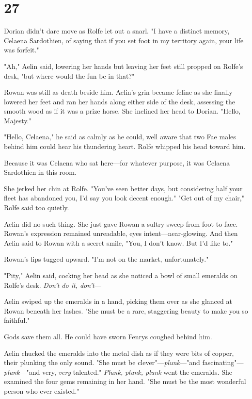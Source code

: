 
\chapter{27}

Dorian didn't dare move as Rolfe let out a snarl. "I have a distinct memory, Celaena Sardothien, of saying that if you set foot in my territory again, your life was forfeit."

"Ah," Aelin said, lowering her hands but leaving her feet still propped on Rolfe's desk, "but where would the fun be in that?"

Rowan was still as death beside him. Aelin's grin became feline as she finally lowered her feet and ran her hands along either side of the desk, assessing the smooth wood as if it was a prize horse. She inclined her head to Dorian. "Hello, Majesty."

"Hello, Celaena," he said as calmly as he could, well aware that two Fae males behind him could hear his thundering heart. Rolfe whipped his head toward him.

Because it was Celaena who sat here---for whatever purpose, it was Celaena Sardothien in this room.

She jerked her chin at Rolfe. "You've seen better days, but considering half your fleet has abandoned you, I'd say you look decent enough." "Get out of my chair," Rolfe said too quietly.

Aelin did no such thing. She just gave Rowan a sultry sweep from foot to face. Rowan's expression remained unreadable, eyes intent---near-glowing. And then Aelin said to Rowan with a secret smile, "You, I don't know. But I'd like to."

Rowan's lips tugged upward. "I'm not on the market, unfortunately."

"Pity," Aelin said, cocking her head as she noticed a bowl of small emeralds on Rolfe's desk. \emph{Don't do it, don't}---

Aelin swiped up the emeralds in a hand, picking them over as she glanced at Rowan beneath her lashes. "She must be a rare, staggering beauty to make you so faithful."

Gods save them all. He could have sworn Fenrys coughed behind him.

Aelin chucked the emeralds into the metal dish as if they were bits of copper, their plunking the only sound. "She must be clever"---\emph{plunk}---"and fascinating"---\emph{plunk}---"and very, \emph{very} talented." \emph{Plunk, plunk, plunk} went the emeralds. She examined the four gems remaining in her hand. "She must be the most wonderful person who ever existed."

